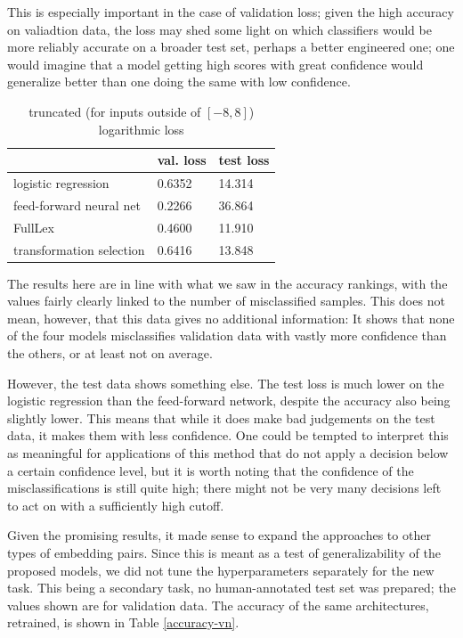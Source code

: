 \documentclass[a4paper, 12pt]{article}
\begin{document}
This is especially important in the case of validation loss; given the high accuracy on valiadtion data, the loss may shed some light on which classifiers would be more reliably accurate on a broader test set, perhaps a better engineered one; one would imagine that a model getting high scores with great confidence would generalize better than one doing the same with low confidence.

\begin{table}[]
	\centering
	\begin{tabular}{l|l|l}
		                         & val. loss & test loss \\ \hline
		logistic regression      & 0.6352    & 14.314    \\
		feed-forward neural net  & 0.2266    & 36.864    \\
		FullLex                  & 0.4600    & 11.910    \\
		transformation selection & 0.6416    & 13.848
	\end{tabular}
	\caption{truncated (for inputs outside of $[-8, 8]$) logarithmic loss}
	\label{loss-an}
\end{table}

The results here are in line with what we saw in the accuracy rankings, with the values fairly clearly linked to the number of misclassified samples. This does not mean, however, that this data gives no additional information: It shows that none of the four models misclassifies validation data with vastly more confidence than the others, or at least not on average.

However, the test data shows something else. The test loss is much lower on the logistic regression than the feed-forward network, despite the accuracy also being slightly lower. This means that while it does make bad judgements on the test data, it makes them with less confidence. One could be tempted to interpret this as meaningful for applications of this method that do not apply a decision below a certain confidence level, but it is worth noting that the confidence of the misclassifications is still quite high; there might not be very many decisions left to act on with a sufficiently high cutoff.

Given the promising results, it made sense to expand the approaches to other types of embedding pairs. Since this is meant as a test of generalizability of the proposed models, we did not tune the hyperparameters separately for the new task. This being a secondary task, no human-annotated test set was prepared; the values shown are for validation data. The accuracy of the same architectures, retrained, is shown in Table \ref{accuracy-vn}.
\end{document}
